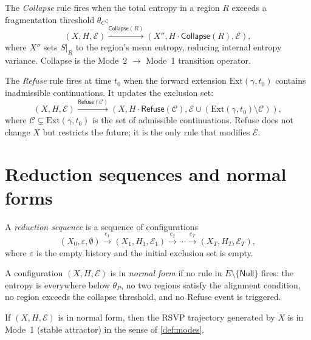 \documentclass[12pt, oneside]{memoir}
\begin{document}
\begin{definition}
\label{def:collapse}
The \emph{Collapse} rule fires when the total entropy in a region $R$ exceeds a
fragmentation threshold $\theta_C$:
\[
  (X, H, \mathcal{E}) \xrightarrow{\mathsf{Collapse}(R)}
  (X'', H \cdot \mathsf{Collapse}(R), \mathcal{E}),
\]
where $X''$ sets $S|_R$ to the region's mean entropy, reducing internal entropy
variance.  Collapse is the Mode~2 $\to$ Mode~1 transition operator.
\end{definition}

\begin{definition}
\label{def:refuse-rule}
The \emph{Refuse} rule fires at time $t_0$ when the forward extension $\mathrm{Ext}
(\gamma, t_0)$ contains inadmissible continuations.  It updates the exclusion set:
\[
  (X, H, \mathcal{E}) \xrightarrow{\mathsf{Refuse}(\mathcal{C})}
  (X, H \cdot \mathsf{Refuse}(\mathcal{C}), \mathcal{E} \cup (\mathrm{Ext}(\gamma,t_0)
  \setminus \mathcal{C})),
\]
where $\mathcal{C} \subsetneq \mathrm{Ext}(\gamma, t_0)$ is the set of admissible
continuations.  Refuse does not change $X$ but restricts the future; it is the only rule
that modifies $\mathcal{E}$.
\end{definition}

\section{Reduction sequences and normal forms}

A \emph{reduction sequence} is a sequence of configurations
\[
  (X_0, \varepsilon, \emptyset)
  \xrightarrow{e_1} (X_1, H_1, \mathcal{E}_1)
  \xrightarrow{e_2} \cdots
  \xrightarrow{e_T} (X_T, H_T, \mathcal{E}_T),
\]
where $\varepsilon$ is the empty history and the initial exclusion set is empty.

\begin{definition}
A configuration $(X, H, \mathcal{E})$ is in \emph{normal form} if no rule in $E
\setminus \{\mathsf{Null}\}$ fires: the entropy is everywhere below $\theta_P$, no two
regions satisfy the alignment condition, no region exceeds the collapse threshold, and no
Refuse event is triggered.
\end{definition}

\begin{proposition}
\label{prop:normal-mode1}
If $(X, H, \mathcal{E})$ is in normal form, then the RSVP trajectory generated by $X$
is in Mode~1 (stable attractor) in the sense of \cref{def:modes}.
\end{proposition}
\end{document}
